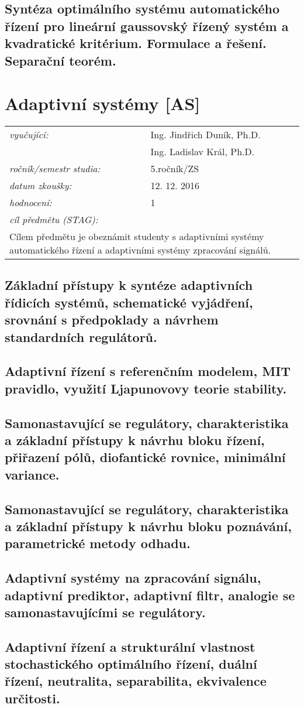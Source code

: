 \subsection{Syntéza optimálního systému automatického řízení pro lineární gaussovský řízený systém a kvadratické kritérium. Formulace a řešení. Separační teorém.}

\section{Adaptivní systémy [AS]}

\begin{table}[H]
\centering
\begin{tabular}{p{4cm} p{12cm}}
\textit{vyučující:}             & Ing. Jindřich Duník, Ph.D. \\
								 & Ing. Ladislav Král, Ph.D. \\
\textit{ročník/semestr studia:} & 5.ročník/ZS \\
\textit{datum zkoušky:}         & 12. 12. 2016 \\
\textit{hodnocení:}             & 1 \\
\textit{cíl předmětu (STAG):}   & \\
\multicolumn{2}{p{16cm}}{Cílem předmětu je obeznámit studenty s adaptivními systémy automatického řízení a adaptivními systémy zpracování signálů.}
\end{tabular}
\end{table}

\subsection{Základní přístupy k syntéze adaptivních řídicích systémů, schematické vyjádření, srovnání s předpoklady a návrhem standardních regulátorů.}

\subsection{Adaptivní řízení s referenčním modelem, MIT pravidlo, využití Ljapunovovy teorie stability.}

\subsection{Samonastavující se regulátory, charakteristika a základní přístupy k návrhu bloku řízení, přiřazení pólů, diofantické rovnice, minimální variance.}

\subsection{Samonastavující se regulátory, charakteristika a základní přístupy k návrhu bloku poznávání, parametrické metody odhadu.}

\subsection{Adaptivní systémy na zpracování signálu, adaptivní prediktor, adaptivní filtr, analogie se samonastavujícími se regulátory.}

\subsection{Adaptivní řízení a strukturální vlastnost stochastického optimálního řízení, duální řízení, neutralita, separabilita, ekvivalence určitosti.}